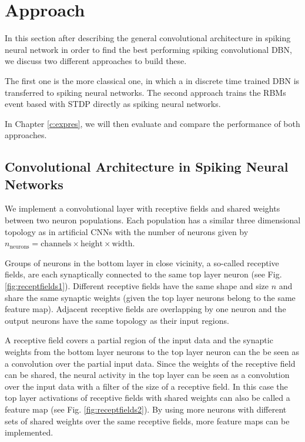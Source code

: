 \chapter{Approach} \label{c:approach}

In this section after describing the general convolutional architecture in spiking neural network in order to find the best performing spiking convolutional DBN, we discuss two different approaches to build these.

The first one is the more classical one, in which a in discrete time trained DBN is transferred to spiking neural networks.
The second approach trains the RBMs event based with STDP directly as spiking neural networks. 

In Chapter \ref{c:expres}, we will then evaluate and compare the performance of both approaches.

\section{Convolutional Architecture in Spiking Neural Networks} \label{c:spikingconvarch}

We implement a convolutional layer with receptive fields and shared weights between two neuron populations. 
Each population has a similar three dimensional topology as in artificial CNNs with the number of neurons given by $n_{ \text{neurons}} = \text{channels} \times \text{height} \times \text{width}$.

Groups of neurons in the bottom layer in close vicinity, a so-called receptive fields, are each synaptically connected to the same top layer neuron (see Fig. \ref{fig:receptfields1}).
Different receptive fields have the same shape and size $n$ and share the same synaptic weights (given the top layer neurons belong to the same feature map).
Adjacent receptive fields are overlapping by one neuron and the output neurons have the same topology as their input regions. 

A receptive field covers a partial region of the input data and the synaptic weights from the bottom layer neurons to the top layer neuron can the be seen as a convolution over the partial input data.
Since the weights of the receptive field can be shared, the neural activity in the top layer can be seen as a convolution over the input data with a filter of the size of a receptive field.
In this case the top layer activations of receptive fields with shared weights can also be called a feature map  (see Fig. \ref{fig:receptfields2}).
By using more neurons with different sets of shared weights over the same receptive fields, more feature maps can be implemented.     

